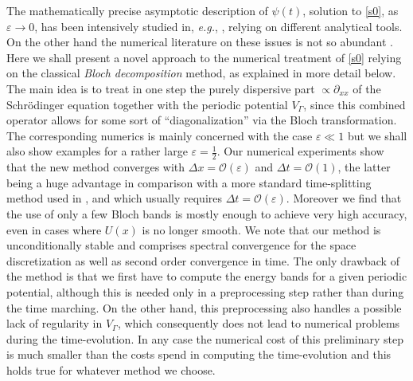 \documentclass[leqno,final]{siamltex}
\numberwithin{equation}{section}
\newcounter{me}
\begin{document}
The mathematically precise asymptotic description of $\psi(t)$,
solution to \eqref{s0}, as ${{\varepsilon }} \to 0$, has been intensively
studied in, {{\sl e.g.\/}}, \cite{BLP, GMMP, GRT, PST}, relying on different
analytical tools. On the other hand the numerical literature on
these issues is not so abundant \cite{Go, GoMa, GoMau}. Here we
shall present a novel approach to  the numerical treatment of
\eqref{s0} relying on the classical \emph{Bloch decomposition}
method, as explained in more detail below. The main idea is to
treat in one step the purely dispersive part $\propto
\partial_{xx}$ of the Schr\"odinger equation together with the
periodic potential $V_\Gamma$, since this combined operator allows
for some sort of ``diagonalization'' via the Bloch transformation.
The corresponding numerics is mainly concerned with the case ${{\varepsilon }}
\ll 1$ but we shall also show examples for a rather large ${{\varepsilon }}
=\frac{1}{2}$. Our numerical experiments show that the new method
converges with $\Delta x={\mathcal O}({{\varepsilon }})$ and $\Delta t={\mathcal O}(1)$, the latter
being a huge advantage in comparison with a more standard
time-splitting method used in \cite{Go, GoMa, GoMau}, and which
usually requires $\Delta t={\mathcal O}({{\varepsilon }})$. Moreover we find that the use
of only a few Bloch bands is mostly enough to achieve very high
accuracy, even in cases where $U(x)$ is no longer smooth. We note
that our method is unconditionally stable and comprises spectral
convergence for the space discretization as well as second order
convergence in time. The only drawback of the method is that we
first have to compute the energy bands for a given periodic
potential, although this is needed only in a preprocessing step
rather than during the time marching. On the other hand, this
preprocessing also handles a possible lack of regularity in
$V_\Gamma$, which consequently does not lead to numerical problems
during the time-evolution. In any case the numerical cost of this
preliminary step is much smaller than the costs spend in computing
the time-evolution and this holds true for whatever method we
choose.
\end{document}

